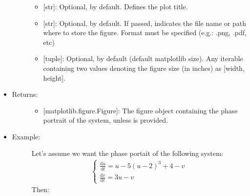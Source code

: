 \documentclass[letterpaper,10pt,english]{sphinxmanual}
\begin{document}
\begin{fulllineitems}
\begin{itemize}
\begin{description}
\begin{itemize}
\item {} 
 {[}str{]}: Optional,  by default. Defines the plot
title.

\item {} 
 {[}str{]}: Optional,  by default. If passed,
indicates the file name or path where to store the figure.
Format must be specified (e.g.: .png, .pdf, etc)

\item {} 
 {[}tuple{]}: Optional,  by default (default
matplotlib size). Any iterable containing two values denoting
the figure size (in inches) as {[}width, height{]}.

\end{itemize}

\end{description}

\item {} \begin{description}
\item[{Returns:}] \leavevmode\begin{itemize}
\item {} 
{[}matplotlib.figure.Figure{]}: The figure object containing the
phase portrait of the system, unless  is provided.

\end{itemize}

\end{description}

\item {} \begin{description}
\item[{Example:}] \leavevmode
Let’s assume we want the phase portait of the following system:
\begin{equation*}
\begin{split}\left\{\begin{array}{l}
\frac{\text{d}u}{\text{d}t}=u-5(u-2)^3+4-v\\
\frac{\text{d}v}{\text{d}t}=3u-v
\end{array}\right.\end{split}
\end{equation*}
Then:


\end{description}
\end{itemize}
\end{fulllineitems}
\end{document}

